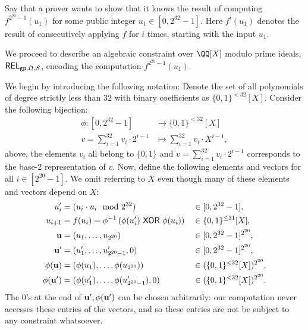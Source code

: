 \documentclass[11pt,letterpaper,usenames,dvipsnames]{article}
\begin{document}
Say that a prover wants to show that it knows the result of computing $f^{2^{20}-1}(u_1)$ for some public integer $u_1\in [0, 2^{32}-1]$. Here $f^{i}(u_1)$ denotes the result of consecutively applying $f$ for $i$ times, starting with the input $u_1$. 


We proceed to describe an algebraic  constraint over $\QQ[X]$ modulo prime ideals, $\mathsf{REL}_{\mathsf{gp}, \mathfrak{Q},\mathcal{S}}$, encoding the computation $f^{2^{20}-1}(u_1)$.

We begin by introducing the following notation: Denote the set of all polynomials of degree strictly less than $32$ with binary coefficients as $\{0,1\}^{< 32}[X]$. Consider the following bijection:
%
\begin{align*}
\phi: [0,2^{32}-1] &\to \{0,1\}^{< 32}[X]\\
v= \sum_{i=1}^{32} v_i\cdot 2^{i-1} &\mapsto \sum_{i=1}^{32} v_i \cdot X^{i-1},
\end{align*}
%
above, the elements $v_i$ all belong to $\{0,1\}$ and $v= \sum_{i=1}^{32} v_i\cdot 2^{i-1}$ corresponds to the base-2 representation of $v$.  Now, define the following elements and vectors  for all $i\in [ 2^{20}-1]$. We omit referring to $X$ even though many of these elements and vectors depend on $X$:
\begin{align*}
  u_i' &= (u_i \cdot u_i \mod 2^{32}) &&\in  [0, 2^{32}-1],\\
  u_{i+1} &=  f(u_i)=\phi^{-1}\left(\phi(u_i') \xor \phi(u_i)\right) &&\in \{0,1\}^{\leq 31}[X],\\
    \uu&=(u_1,\ldots, u_{2^{20}}) &&\in [0,2^{32}-1]^{2^{20}},\\
    \uu' &= (u_1',\ldots, u_{2^{20}-1}', 0) &&\in [0,2^{32}-1]^{2^{20}},\\
        \phi(\uu) &= (\phi(u_1),\ldots, \phi(u_{2^{20}}))&& \in (\{0,1\}^{< 32}[X])^{2^{20}},\\
    \phi(\uu') &= (\phi(u_1'),\ldots, \phi(u_{2^{20}-1}'),0) &&\in (\{0,1\}^{< 32}[X])^{2^{20}}.%
\end{align*}
The $0$'s at the end of $\mathbf{u}', \phi(\mathbf{u}')$ can be chosen arbitrarily: our computation never accesses these entries of the vectors, and so these entries are not be subject to any constraint whatsoever. 
\end{document}
